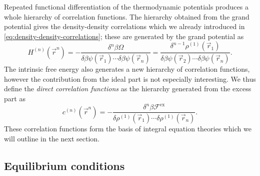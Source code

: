 Repeated functional differentiation of the thermodynamic potentials produces a whole hierarchy of correlation functions.
The hierarchy obtained from the grand potential gives the density-density correlations which we already introduced in \eqref{eq:density-density-correlations};
these are generated by the grand potential as \cite{Hansen2013}
\begin{equation}\label{eq:density-density-generator}
  H^{(n)}(\vec{r}^n)
  =
  - \frac{
    \delta^n \beta \Omega
  }{
    \delta \beta\psi(\vec{r}_1) \cdots \delta \beta\psi(\vec{r}_n)
  }
  =
  \frac{
    \delta^{n-1} \rho^{(1)}(\vec{r}_1)
  }{
    \delta \beta\psi(\vec{r}_2) \cdots \delta \beta\psi(\vec{r}_n)
  }.
\end{equation}
The intrinsic free energy also generates a new hierarchy of correlation functions, however the contribution from the ideal part is not especially interesting.
We thus define the \emph{direct correlation functions} as the hierarchy generated from the excess part as
\begin{equation}\label{eq:direct-correlations}
  c^{(n)}(\vec{r}^n)
  =
  - \frac{
    \delta^n \beta \mathcal{F}^\mathrm{ex}
  }{
    \delta \rho^{(1)}(\vec{r}_1) \cdots \delta \rho^{(1)}(\vec{r}_n)
  }.
\end{equation}
These correlation functions form the basis of integral equation theories which we will outline in the next section.

\subsection{Equilibrium conditions}
\label{sec:oz-equation}

